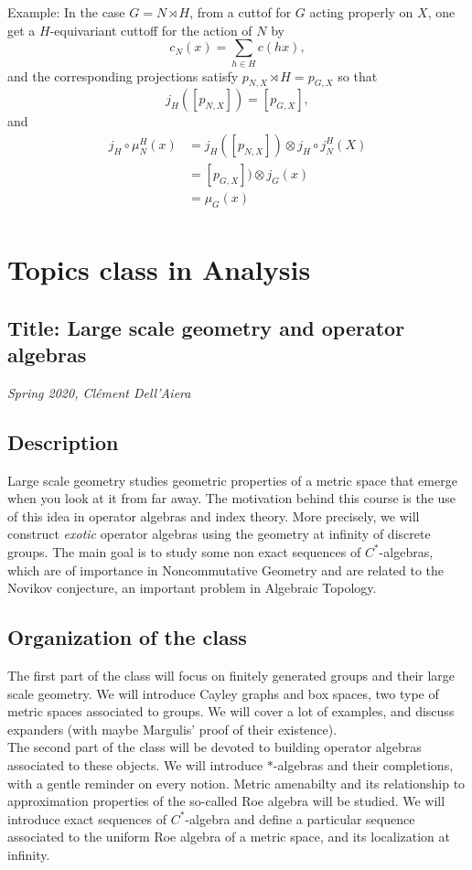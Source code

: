 Example: In the case $G=N\rtimes H$, from a cuttof for $G$ acting properly on $X$, one get a $H$-equivariant cuttoff for the action of $N$ by 
\[c_N (x) =\sum_{h\in H} c(hx),\]
and the corresponding projections satisfy $p_{N,X} \rtimes H = p_{G,X}$ so that 
\[ j_H([p_{N,X}]) = [p_{G,X}],\]
and
\[\begin{split}
j_H \circ\mu_N^H(x) & = j_H([p_{N,X}]) \otimes j_H\circ j^H_N(X) \\
			& = [p_{G,X}]) \otimes j_G(x)\\
			&= \mu_G(x)\\
\end{split}\]
\newpage

\section{Topics class in Analysis}

\subsection*{Title: Large scale geometry and operator algebras}
\textit{Spring 2020, Cl\'ement Dell'Aiera}
\subsection*{Description} 
Large scale geometry studies geometric properties of a metric space that emerge when you look at it from far away. The motivation behind this course is the use of this idea in operator algebras and index theory. More precisely, we will construct \textit{exotic} operator algebras using the geometry at infinity of discrete groups. The main goal is to study some non exact sequences of $C^*$-algebras, which are of importance in Noncommutative Geometry and are related to the Novikov conjecture, an important problem in Algebraic Topology.

\subsection*{Organization of the class}
The first part of the class will focus on finitely generated groups and their large scale geometry. We will introduce Cayley graphs and box spaces, two type of metric spaces associated to groups. We will cover a lot of examples, and discuss expanders (with maybe Margulis' proof of their existence).\\

The second part of the class will be devoted to building operator algebras associated to these objects. We will introduce $*$-algebras and their completions, with a gentle reminder on every notion. Metric amenabilty and its relationship to approximation properties of the so-called Roe algebra will be studied. We will introduce exact sequences of $C^*$-algebra and define a particular sequence associated to the uniform Roe algebra of a metric space, and its localization at infinity.\\

